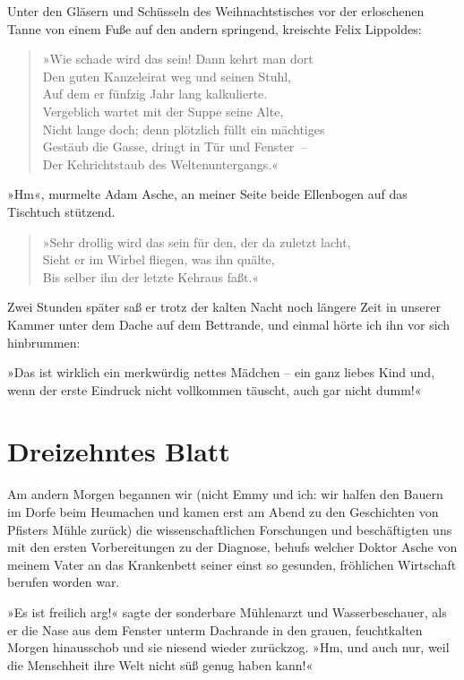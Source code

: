 Unter den Gläsern und Schüsseln des Weihnachtstisches vor der
erloschenen Tanne von einem Fuße auf den andern springend,
kreischte Felix Lippoldes:

\begin{verse}
»Wie schade wird das sein! Dann kehrt man dort\\
Den guten Kanzeleirat weg und seinen Stuhl,\\
Auf dem er fünfzig Jahr lang kalkulierte.\\
Vergeblich wartet mit der Suppe seine Alte,\\
Nicht lange doch; denn plötzlich füllt ein mächtiges\\
Gestäub die Gasse, dringt in Tür und Fenster~–\\
Der Kehrichtstaub des Weltenuntergangs.«
\end{verse}

»Hm«, murmelte Adam Asche, an meiner Seite beide Ellenbogen auf das
Tischtuch stützend.

\begin{verse}
»Sehr drollig wird das sein für den, der da zuletzt lacht,\\
Sieht er im Wirbel fliegen, was ihn quälte,\\
Bis selber ihn der letzte Kehraus faßt.«
\end{verse}

Zwei Stunden später saß er trotz der kalten Nacht noch längere Zeit
in unserer Kammer unter dem Dache auf dem Bettrande, und einmal
hörte ich ihn vor sich hinbrummen:

»Das ist wirklich ein merkwürdig nettes Mädchen – ein ganz liebes
Kind und, wenn der erste Eindruck nicht vollkommen täuscht, auch
gar nicht dumm!«

\section{Dreizehntes Blatt}

Am andern Morgen begannen wir (nicht Emmy und ich: wir halfen den
Bauern im Dorfe beim Heumachen und kamen erst am Abend zu den
Geschichten von Pfisters Mühle zurück) die wissenschaftlichen
Forschungen und beschäftigten uns mit den ersten Vorbereitungen zu
der Diagnose, behufs welcher Doktor Asche von meinem Vater an das
Krankenbett seiner einst so gesunden, fröhlichen Wirtschaft berufen
worden war.

»Es ist freilich arg!« sagte der sonderbare Mühlenarzt und
Wasserbeschauer, als er die Nase aus dem Fenster unterm Dachrande
in den grauen, feuchtkalten Morgen hinausschob und sie niesend
wieder zurückzog. »Hm, und auch nur, weil die Menschheit ihre Welt
nicht süß genug haben kann!«

